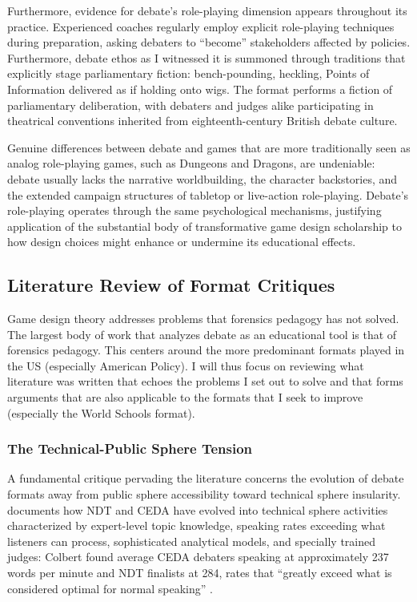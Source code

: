 Furthermore, evidence for debate's role-playing dimension appears throughout its practice. Experienced coaches regularly employ explicit role-playing techniques during preparation, asking debaters to ``become'' stakeholders affected by policies. Furthermore, debate ethos as I witnessed it is summoned through traditions that explicitly stage parliamentary fiction: bench-pounding, heckling, Points of Information delivered as if holding onto wigs. The format performs a fiction of parliamentary deliberation, with debaters and judges alike participating in theatrical conventions inherited from eighteenth-century British debate culture.

Genuine differences between debate and games that are more traditionally seen as analog role-playing games, such as Dungeons and Dragons, are undeniable: debate usually lacks the narrative worldbuilding, the character backstories, and the extended campaign structures of tabletop or live-action role-playing. Debate's role-playing operates through the same psychological mechanisms, justifying application of the substantial body of transformative game design scholarship to how design choices might enhance or undermine its educational effects.

\subsection{Literature Review of Format Critiques}

Game design theory addresses problems that forensics pedagogy has not solved. The largest body of work that analyzes debate as an educational tool is that of forensics pedagogy. This centers around the more predominant formats played in the US (especially American Policy). I will thus focus on reviewing what literature was written that echoes the problems I set out to solve and that forms arguments that are also applicable to the formats that I seek to improve (especially the World Schools format).

\subsubsection{The Technical-Public Sphere Tension}

A fundamental critique pervading the literature concerns the evolution of debate formats away from public sphere accessibility toward technical sphere insularity. \textcite{combs2002applying} documents how NDT and CEDA have evolved into technical sphere activities characterized by expert-level topic knowledge, speaking rates exceeding what listeners can process, sophisticated analytical models, and specially trained judges: Colbert found average CEDA debaters speaking at approximately 237 words per minute and NDT finalists at 284, rates that ``greatly exceed what is considered optimal for normal speaking'' \parencite[p.~36]{combs2002applying}.

